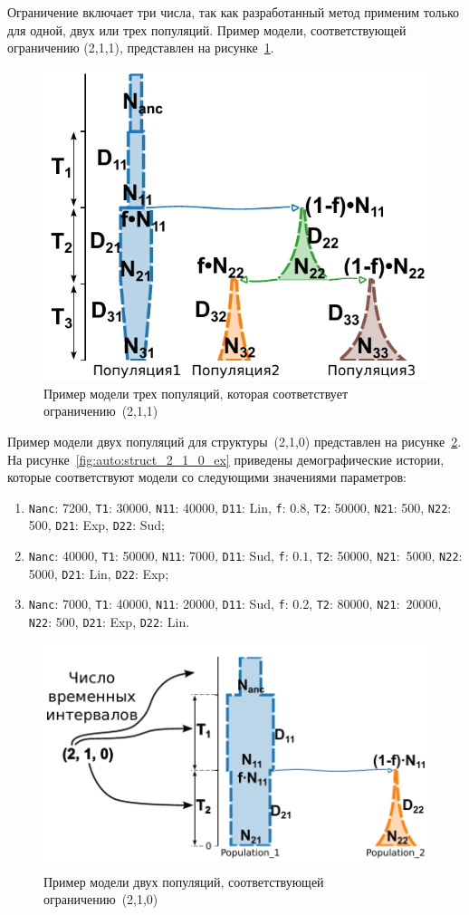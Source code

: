 Ограничение включает три числа, так как разработанный метод применим только для одной, двух или трех популяций. Пример модели, соответствующей ограничению (2,1,1), представлен на рисунке~\ref{fig:auto:struct_2_1_1}.
\begin{figure}[ht]
    \centering
    \includegraphics[width=0.6\linewidth]{images_2/struct_2_1_1.pdf}
    \caption{Пример модели трех популяций, которая соответствует ограничению~(2,1,1)}
    \label{fig:auto:struct_2_1_1}
\end{figure}

Пример модели двух популяций для структуры~(2,1,0) представлен на рисунке~\ref{fig:auto:struct_2_1_0}.
На рисунке~\ref{fig:auto:struct_2_1_0_ex} приведены демографические истории, которые соответствуют модели со следующими значениями параметров:
\begin{enumerate}
    \item \texttt{Nanc}: 7200, \texttt{T1}: 30000, \texttt{N11}: 40000, \texttt{D11}: Lin, \texttt{f}: $0.8$, \texttt{T2}: 50000, \texttt{N21}: 500, \texttt{N22}: 500, \texttt{D21}: Exp, \texttt{D22}: Sud;
    \item \texttt{Nanc}: 40000, \texttt{T1}: 50000, \texttt{N11}: 7000, \texttt{D11}: Sud, \texttt{f}: $0.1$, \texttt{T2}: 50000, \texttt{N21}:~5000, \texttt{N22}: 5000, \texttt{D21}: Lin, \texttt{D22}: Exp;
    \item \texttt{Nanc}: 7000, \texttt{T1}: 40000, \texttt{N11}: 20000, \texttt{D11}: Sud, \texttt{f}: 0.2, \texttt{T2}: 80000, \texttt{N21}:~20000, \texttt{N22}: 500, \texttt{D21}: Exp, \texttt{D22}: Lin.\\
\end{enumerate}

\begin{figure}[ht]
    \centering
    \includegraphics[width=0.6\linewidth]{images_2/picture_2pops_str_base.pdf}
    \caption{Пример модели двух популяций, соответствующей ограничению~(2,1,0)}
    \label{fig:auto:struct_2_1_0}
\end{figure}

